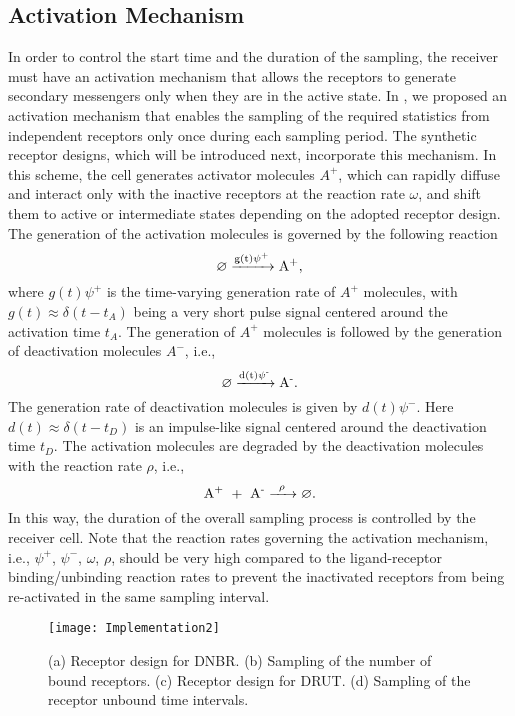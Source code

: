 \documentclass[twocolumn]{IEEEtran}
\begin{document}
\subsection{Activation Mechanism}
In order to control the start time and the duration of the sampling, the receiver must have an activation mechanism that allows the receptors to generate secondary messengers only when they are in the active state. In \cite{kuscu2019channel}, we proposed an activation mechanism that enables the sampling of the required statistics from independent receptors only once during each sampling period. The synthetic receptor designs,  which will be introduced next, incorporate this mechanism. In this scheme, the cell generates activator molecules $A^+$, which can rapidly diffuse and interact only with the inactive receptors at the reaction rate $\omega$, and shift them to active or intermediate states depending on the adopted receptor design. The generation of the activation molecules is governed by the following reaction
\begin{equation}
\ce{ {\varnothing}  ->[{g(t)\psi^+}] {A^+}},
\end{equation}
where $g(t) \psi^+$ is the time-varying generation rate of $A^+$ molecules, with $g(t) \approx \delta(t-t_A)$ being a very short pulse signal centered around the activation time $t_A$. The generation of $A^+$ molecules is followed by 
the generation of deactivation molecules $A^-$, i.e.,
\begin{equation}
\ce{ {\varnothing}  ->[{d(t)\psi^-}] {A^-}}.
\end{equation}
The generation rate of deactivation molecules is given by $d(t) \psi^-$. Here $d(t) \approx \delta(t-t_D)$ is an impulse-like signal centered around the deactivation time $t_D$. The activation molecules are degraded by the deactivation molecules with the reaction rate $\rho$, i.e.,
\begin{equation}
\ce{ {A^+ + A^-} ->[{\rho}] {\varnothing} }.
\end{equation}
In this way, the duration of the overall sampling process is controlled by the receiver cell. Note that the reaction rates governing the activation mechanism, i.e., $\psi^+$, $\psi^-$, $\omega$, $\rho$, should be very high compared to the ligand-receptor binding/unbinding reaction rates to prevent the inactivated receptors from being re-activated in the same sampling interval. 
\begin{figure*}[!t]
	\centering
	\texttt{[image: Implementation2]}
	\caption{(a) Receptor design for DNBR. (b) Sampling of the number of bound receptors. (c) Receptor design for DRUT. (d) Sampling of the receptor unbound time intervals. }
	\label{fig:implementation1}
\end{figure*}
\end{document}
